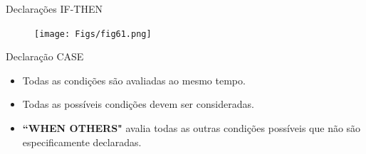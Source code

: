 \documentclass[aspectratio=169]{beamer}
\begin{document}
\begin{frame}{Declarações IF-THEN}
	\justifying
	
	\begin{figure}[h]
		\centering
		\texttt{[image: Figs/fig61.png]}
	\end{figure}
	
	
	
\end{frame}
%	
%	
%	
%
%	
\begin{frame}{Declaração CASE}
	\justifying
	
	
	\begin{block}{}
	\begin{itemize}
		\item Todas as condições são avaliadas ao mesmo tempo.
		\item Todas as possíveis condições devem ser consideradas. 
		\item \textbf{``WHEN OTHERS"} avalia todas as outras condições possíveis que não são especificamente declaradas.
	\end{itemize}
	
	\end{block}	
	
	
	
	
\end{frame}
\end{document}

